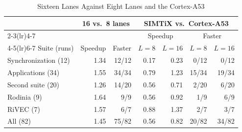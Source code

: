 \begin{table}[t]
\caption{Sixteen Lanes Against Eight Lanes and the Cortex-A53}
\label{tab:lanes16_board}
\centering\footnotesize
\setlength{\tabcolsep}{3.2pt}
\begin{tabular}{@{}lrrrrrr@{}}
\toprule
 & \multicolumn{2}{c}{16 vs.\ 8 lanes} & \multicolumn{4}{c}{SIMTiX vs.\ Cortex-A53}\\
\cmidrule(lr){2-3}\cmidrule(lr){4-7}
 & & & \multicolumn{2}{c}{Speedup} & \multicolumn{2}{c}{Faster}\\
\cmidrule(lr){4-5}\cmidrule(lr){6-7}
Suite (runs) & Speedup & Faster & $L=8$ & $L=16$ & $L=8$ & $L=16$\\
\midrule
Synchronization (12) & 1.34 & 12/12 & 0.17 & 0.23 & 0/12 & 0/12\\
Applications (34) & 1.55 & 34/34 & 0.79 & 1.23 & 15/34 & 19/34\\
Second suite (20) & 1.26 & 14/20 & 0.56 & 0.71 & 2/20 & 6/20\\
Rodinia (9) & 1.64 & 9/9 & 0.56 & 0.92 & 1/9 & 6/9\\
RiVEC (7) & 1.57 & 6/7 & 0.88 & 1.37 & 2/7 & 3/7\\
\midrule
All (82) & 1.45 & 75/82 & 0.56 & 0.82 & 20/82 & 34/82\\
\bottomrule
\end{tabular}
\end{table}
